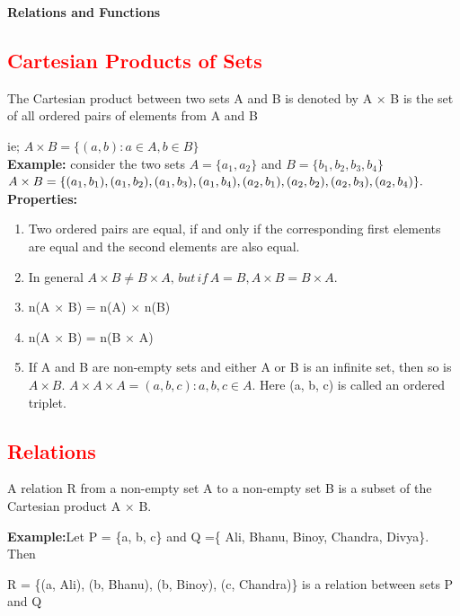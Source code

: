 \documentclass{article}
\begin{document}
\begin{center}
    {\LARGE \textbf{Relations and Functions} }
\end{center}

\begin{multicols}{2}

  \subsection*{\textcolor{red}{Cartesian Products of Sets}}
The Cartesian product between two sets A and B is denoted by A × B is the set of all ordered pairs of elements from A and B

ie; $A \times B = \{(a, b): a \in A, b \in B\}$
\\
\textbf{Example: }consider the two sets $A= \{a_1, a_2\}$ and
$B = \{b_1, b_2, b_3, b_4\}$ \\
$A \times B = \{( a_1, b_1), (a_1, b_2), (a_1, b_3), (a_1, b_4), (a_2, b_1)\\
, (a_2, b_2),
(a_2, b_3), (a_2, b_4)\}.$
\\

\textbf{Properties: }
\begin{enumerate}
    \item Two ordered pairs are equal, if and only if the corresponding first elements
are equal and the second elements are also equal.
    \item   In general $A \times B \not = B \times A, \,but \, if\, A = B, A \times B = B \times A.$
    \item    n(A × B) = n(A) × n(B)
    \item n(A × B) = n(B × A)
    \item  If A and B are non-empty sets and either A or B is an infinite set, then so is
$A \times B$.
    $A \times A \times A = {(a, b, c) : a, b, c \in A}$. Here (a, b, c) is called an ordered
triplet.

   
\end{enumerate}


\subsection*{\textcolor{red}{Relations}}
A relation R from a non-empty set A to a non-empty set B is a subset of the Cartesian product A × B.

\textbf{Example:}Let  P = \{a, b, c\} and Q =\{ Ali, Bhanu, Binoy, Chandra, Divya\}. Then 

R = \{(a, Ali), (b, Bhanu), (b, Binoy), (c, Chandra)\} is a relation between sets P and Q


\end{multicols}
\end{document}
